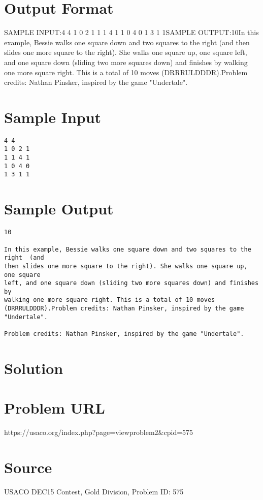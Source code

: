 \documentclass[12pt]{article}
\begin{document}
\section*{Output Format}
SAMPLE INPUT:4 4
1 0 2 1
1 1 4 1
1 0 4 0
1 3 1 1SAMPLE OUTPUT:10In this example, Bessie walks one square down and two squares to the right  (and
then slides one more square to the right). She walks one square up, one square 
left, and one square down (sliding two more squares down) and finishes by
walking one more square right. This is a total of 10 moves (DRRRULDDDR).Problem credits: Nathan Pinsker, inspired by the game "Undertale".

\section*{Sample Input}
\begin{verbatim}
4 4
1 0 2 1
1 1 4 1
1 0 4 0
1 3 1 1
\end{verbatim}

\section*{Sample Output}
\begin{verbatim}
10

In this example, Bessie walks one square down and two squares to the right  (and
then slides one more square to the right). She walks one square up, one square 
left, and one square down (sliding two more squares down) and finishes by
walking one more square right. This is a total of 10 moves (DRRRULDDDR).Problem credits: Nathan Pinsker, inspired by the game "Undertale".

Problem credits: Nathan Pinsker, inspired by the game "Undertale".
\end{verbatim}

\section*{Solution}


\section*{Problem URL}
https://usaco.org/index.php?page=viewproblem2&cpid=575

\section*{Source}
USACO DEC15 Contest, Gold Division, Problem ID: 575
\end{document}
